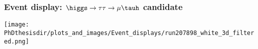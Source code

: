 %
%

\begin{frame}
\frametitle{Event display: $\higgs\to\tau\tau\to\mu\tauh$ candidate}

\vfill

\begin{center}
\texttt{[image: \\PhDthesisdir/plots\_and\_images/Event\_displays/run207898\_white\_3d\_filtered.png]}
\end{center}

\vfill
\end{frame}
